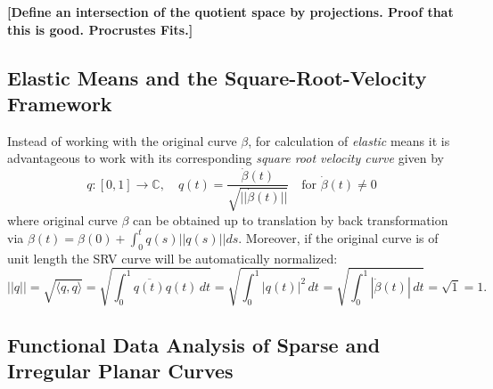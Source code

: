 \textbf{[Define an intersection of the quotient space by projections. Proof that this is good. Procrustes Fits.]}

\subsection{Elastic Means and the Square-Root-Velocity Framework}
\label{theo:srv}
Instead of working with the original curve $\beta$, for calculation of
\textit{elastic} means it is advantageous to work with its corresponding
\textit{square root velocity curve} given by
$$ q : [0, 1] \rightarrow \mathbb{C}, \quad q(t) =
\frac{\dot{\beta}(t)}{\sqrt{|| \dot{\beta}(t) ||}} \quad \text{for} \,\,
\dot{\beta}(t) \neq 0 $$
where original curve $\beta$ can be obtained up to translation by back
transformation via $\beta(t) = \beta(0) + \int_0^t q(s) || q(s) || ds$.
Moreover, if the original curve is of unit length the SRV curve will be
automatically normalized:
$$ ||q|| = \sqrt{\langle q, q \rangle} = \sqrt{ \int_0^1 \overline{q(t)} q(t)
\, dt } = \sqrt{ \int_0^1 |q(t)|^2 \, dt} = \sqrt{\int_0^1 |\dot{\beta}(t)| \,
dt} = \sqrt{1} = 1. $$
\subsection{Functional Data Analysis of Sparse and Irregular Planar Curves}
\label{theo:sparse}


\newpage
